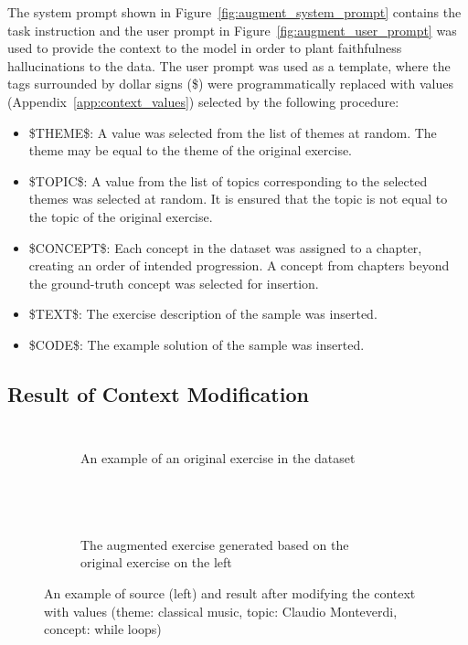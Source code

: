 \documentclass[english, 12pt, a4paper, sci, utf8, a-2b, online]{latex/definitions/aaltothesis}
\begin{document}
The system prompt shown in Figure~\ref{fig:augment_system_prompt} contains the task instruction and the user prompt in Figure~\ref{fig:augment_user_prompt} was used to provide the context to the model in order to plant faithfulness hallucinations to the data. The user prompt was used as a template, where the tags surrounded by dollar signs (\$) were programmatically replaced with values (Appendix~\ref{app:context_values}) selected by the following procedure:
\begin{itemize}
    \item \$THEME\$: A value was selected from the list of themes at random. The theme may be equal to the theme of the original exercise.
    \item \$TOPIC\$: A value from the list of topics corresponding to the selected themes was selected at random. It is ensured that the topic is not equal to the topic of the original exercise.
    \item \$CONCEPT\$: Each concept in the dataset was assigned to a chapter, creating an order of intended progression. A concept from chapters beyond the ground-truth concept was selected for insertion.
    \item \$TEXT\$: The exercise description of the sample was inserted.
    \item \$CODE\$: The example solution of the sample was inserted.
\end{itemize}

\clearpage

\subsection{Result of Context Modification}
\begin{figure}[!h]
    \centering
    \begin{subfigure}[b]{0.49\textwidth}
    \inputminted{text}{./minted_inputs/example_original_problem.txt}
    \inputminted{dart}{./minted_inputs/example_original_solution.txt}
    \caption{An example of an original exercise in the dataset}
    \label{fig:og_ex}
    \end{subfigure}%
    ~ 
    \begin{subfigure}[b]{0.49\textwidth}
    \inputminted{text}{./minted_inputs/example_augmented_problem.txt}
    \inputminted{dart}{./minted_inputs/example_augmented_solution.txt}
    \caption{The augmented exercise generated based on the original exercise on the left}
    \label{fig:ag_ex}
    \end{subfigure}
    \caption{An example of source (left) and result after modifying the context with values (theme: classical music, topic: Claudio Monteverdi, concept: while loops)}
    \label{fig:context_modification}
\end{figure}
\end{document}
